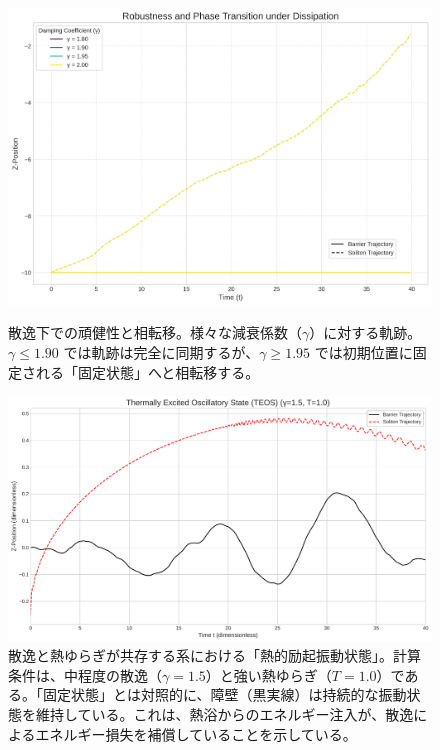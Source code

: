 \documentclass[a4paper,11pt,ja=standard,lualatex]{bxjsarticle}
\begin{document}
\begin{figure}[htbp]
    \centering 

    \begin{minipage}{1.0\textwidth}
        \centering
        \includegraphics[width=0.9\linewidth]{fig3_dissipation.pdf}
        \caption{散逸下での頑健性と相転移。様々な減衰係数（$\gamma$）に対する軌跡。$\gamma \le 1.90$ では軌跡は完全に同期するが、$\gamma \ge 1.95$ では初期位置に固定される「固定状態」へと相転移する。}
        \label{fig:dissipation}
    \end{minipage}

    \vspace{1cm} 

    \begin{minipage}{1.0\textwidth}
        \centering
        \includegraphics[width=0.9\linewidth]{fig2_TEOS_framed_thin.pdf}
        \caption{散逸と熱ゆらぎが共存する系における「熱的励起振動状態」。計算条件は、中程度の散逸（$\gamma=1.5$）と強い熱ゆらぎ（$T=1.0$）である。「固定状態」とは対照的に、障壁（黒実線）は持続的な振動状態を維持している。これは、熱浴からのエネルギー注入が、散逸によるエネルギー損失を補償していることを示している。}
        \label{fig:TEOS}
    \end{minipage}

\end{figure}
\end{document}
